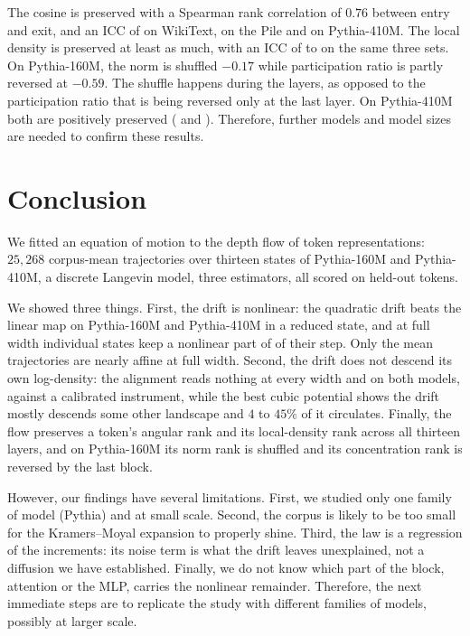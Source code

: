 \documentclass[mlmain]{jmlr}
\begin{document}
The cosine is preserved with a Spearman rank correlation of $0.76$
between entry and exit, and an ICC of \crPresWikiSmall{} on
WikiText, \crPresPileSmall{} on the Pile and \crPresWikiLarge{} on
Pythia-410M. The local
density is preserved at least as much, with an ICC of \crDensIccMin{}
to \crDensIccMax{} on the same three sets.
On Pythia-160M, the norm is shuffled $-0.17$ while participation ratio is partly reversed at $-0.59$.
The shuffle happens during the layers, as opposed to the participation ratio that is being reversed only at the last layer.
On Pythia-410M both are positively preserved (\crNormFourTen{} and
\crPartFourTen). Therefore, further models and model sizes are needed to
confirm these results.

\section{Conclusion}

We fitted an equation of motion to the depth flow of token
representations: $25{,}268$ corpus-mean trajectories over thirteen
states of Pythia-160M and Pythia-410M, a discrete Langevin model, three estimators,
all scored on held-out tokens.


We showed three things. First, the drift is nonlinear: the quadratic drift
beats the linear map on Pythia-160M and Pythia-410M in a reduced state, and at full width individual states keep a nonlinear part of \crOccFwShareMed{} of their step. Only the mean trajectories are nearly affine at full width. Second, the drift does not
descend its own log-density: the alignment reads nothing at every
width and on both models, against a calibrated instrument, while the
best cubic potential shows the drift mostly descends some other
landscape and $4$ to $45\%$ of it circulates. Finally, the flow preserves a token's angular rank and its
local-density rank across all thirteen layers, and on Pythia-160M
its norm rank is shuffled and its concentration rank is reversed by the
last block.


However, our findings have several limitations. First, we studied only one family of model (Pythia) and at small scale.
Second, the corpus is likely to be too small for the Kramers–Moyal expansion to properly shine.
Third, the law is a regression of the increments: its noise term is
what the drift leaves unexplained, not a diffusion we have established.
Finally, we do not know which part of the block, attention or the MLP,
carries the nonlinear remainder. Therefore,
the next immediate steps are to replicate the study with different families of models, possibly at larger scale.
\end{document}
